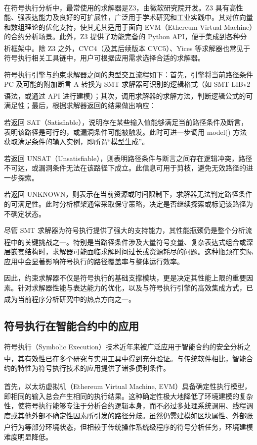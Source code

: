 \documentclass[print, master, vlined, timesmath]{DissertUESTC}
\begin{document}
在符号执行分析中，最常使用的求解器是Z3\textsuperscript{\cite{...}}，由微软研究院开发。Z3 具有高性能、强表达能力及良好的可扩展性，广泛用于学术研究和工业实践中。其对位向量和数组理论的优化支持，使其尤其适用于面向 EVM（Ethereum Virtual Machine）的合约分析场景。此外，Z3 提供了功能完备的 Python API，便于集成到各种分析框架中。除 Z3 之外，CVC4（及其后续版本 CVC5）\textsuperscript{\cite{...}}、Yices\textsuperscript{\cite{...}} 等求解器也常见于符号执行相关工具链中，用户可根据应用需求选择合适的求解器。

符号执行引擎与约束求解器之间的典型交互流程如下：首先，引擎将当前路径条件 PC 及可能的附加断言 A 转换为 SMT 求解器可识别的逻辑格式（如 SMT-LIBv2 语法\textsuperscript{\cite{...}}，或通过 API 进行建模）；其次，调用求解器的求解方法，判断逻辑公式的可满足性；最后，根据求解器返回的结果做出响应：

若返回 SAT（Satisfiable），说明存在某些输入值能够满足当前路径条件及断言，表明该路径是可行的，或漏洞条件可能被触发。此时可进一步调用 model() 方法获取满足条件的输入实例，即所谓“模型生成”。

若返回 UNSAT（Unsatisfiable），则表明路径条件与断言之间存在逻辑冲突，路径不可达，或漏洞条件无法在该路径下成立。此信息可用于剪枝，避免无效路径的进一步探索。

若返回 UNKNOWN，则表示在当前资源或时间限制下，求解器无法判定路径条件的可满足性。此时分析框架通常采取保守策略，决定是否继续探索或标记该路径为不确定状态。

尽管 SMT 求解器为符号执行提供了强大的支持能力，其性能瓶颈仍是整个分析流程中的关键挑战之一\textsuperscript{\cite{...}}。特别是当路径条件涉及大量符号变量、复杂表达式组合或深层嵌套结构时，求解器可能面临求解时间过长或资源耗尽的问题。这种瓶颈在实际应用中会显著影响符号执行的路径覆盖率与整体运行效率。

因此，约束求解器不仅是符号执行的基础支撑模块，更是决定其性能上限的重要因素。针对求解器性能与表达能力的优化，以及与符号执行引擎的高效集成方式，已成为当前程序分析研究中的热点方向之一\textsuperscript{\cite{...}}。

\subsection{符号执行在智能合约中的应用}

符号执行（Symbolic Execution）技术近年来被广泛应用于智能合约的安全分析之中，其有效性已在多个研究与实用工具中得到充分验证\textsuperscript{\cite{...}}。与传统软件相比，智能合约的特性为符号执行技术的应用提供了诸多便利条件。

首先，以太坊虚拟机（Ethereum Virtual Machine, EVM）具备确定性执行模型\textsuperscript{\cite{...}}，即相同的输入总会产生相同的执行结果。这种确定性极大地降低了环境建模的复杂性，使符号执行能够专注于分析合约逻辑本身，而不必过多处理系统调用、线程调度或其他外部不确定性因素所引发的路径分歧。虽然仍需建模如区块属性、外部账户行为等部分环境状态\textsuperscript{\cite{...}}，但相较于传统操作系统级程序的符号分析任务，环境建模难度明显降低。
\end{document}
